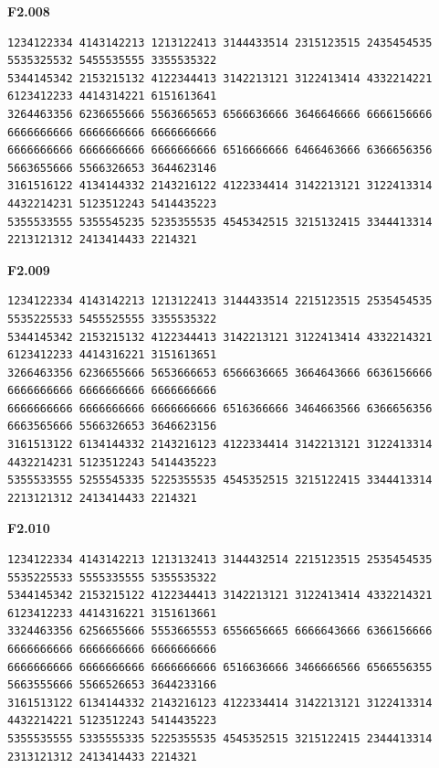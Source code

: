 \noindent\begin{minipage}{\linewidth}\textbf{F2.008}
\begin{lstlisting}
1234122334 4143142213 1213122413 3144433514 2315123515 2435454535 5535325532 5455535555 3355535322
5344145342 2153215132 4122344413 3142213121 3122413414 4332214221 6123412233 4414314221 6151613641
3264463356 6236655666 5563665653 6566636666 3646646666 6666156666 6666666666 6666666666 6666666666
6666666666 6666666666 6666666666 6516666666 6466463666 6366656356 5663655666 5566326653 3644623146
3161516122 4134144332 2143216122 4122334414 3142213121 3122413314 4432214231 5123512243 5414435223
5355533555 5355545235 5235355535 4545342515 3215132415 3344413314 2213121312 2413414433 2214321
\end{lstlisting}
\end{minipage}\par\smallskip

\noindent\begin{minipage}{\linewidth}\textbf{F2.009}
\begin{lstlisting}
1234122334 4143142213 1213122413 3144433514 2215123515 2535454535 5535225533 5455525555 3355535322
5344145342 2153215132 4122344413 3142213121 3122413414 4332214321 6123412233 4414316221 3151613651
3266463356 6236655666 5653666653 6566636665 3664643666 6636156666 6666666666 6666666666 6666666666
6666666666 6666666666 6666666666 6516366666 3464663566 6366656356 6663565666 5566326653 3646623156
3161513122 6134144332 2143216123 4122334414 3142213121 3122413314 4432214231 5123512243 5414435223
5355533555 5255545335 5225355535 4545352515 3215122415 3344413314 2213121312 2413414433 2214321
\end{lstlisting}
\end{minipage}\par\smallskip

\noindent\begin{minipage}{\linewidth}\textbf{F2.010}
\begin{lstlisting}
1234122334 4143142213 1213132413 3144432514 2215123515 2535454535 5535225533 5555335555 5355535322
5344145342 2153215122 4122344413 3142213121 3122413414 4332214321 6123412233 4414316221 3151613661
3324463356 6256655666 5553665553 6556656665 6666643666 6366156666 6666666666 6666666666 6666666666
6666666666 6666666666 6666666666 6516636666 3466666566 6566556355 5663555666 5566526653 3644233166
3161513122 6134144332 2143216123 4122334414 3142213121 3122413314 4432214221 5123512243 5414435223
5355535555 5335555335 5225355535 4545352515 3215122415 2344413314 2313121312 2413414433 2214321
\end{lstlisting}
\end{minipage}\par\smallskip

